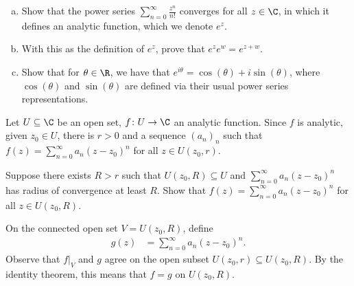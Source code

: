 \documentclass[10pt]{mypackage}
\begin{document}
\RaggedRight
\begin{problem}\hfill
  \begin{enumerate}[(a)]
    \item Show that the power series $\sum_{n=0}^{\infty}\frac{z^{n}}{n!}$ converges for all $z\in \C$, in which it defines an analytic function, which we denote $e^{z}$.
    \item With this as the definition of $e^{z}$, prove that $e^{z}e^{w} = e^{z+w}$.
    \item Show that for $\theta\in \R$, we have that $e^{i\theta} = \cos\left( \theta \right) + i\sin\left( \theta \right)$, where $\cos\left( \theta \right)$ and $\sin\left( \theta \right)$ are defined via their usual power series representations.
  \end{enumerate}
\end{problem}
\begin{problem}
  Let $U\subseteq \C$ be an open set, $f\colon U\rightarrow \C$ an analytic function. Since $f$ is analytic, given $z_0\in U$, there is $r > 0$ and a sequence $\left( a_n \right)_n$ such that $f(z) = \sum_{n=0}^{\infty}a_n\left( z-z_0 \right)^{n}$ for all $z\in U\left( z_0,r \right)$.\newline

  Suppose there exists $R > r$ such that $U\left( z_0,R \right) \subseteq U$ and $\sum_{n=0}^{\infty}a_n\left( z-z_0 \right)^{n}$ has radius of convergence at least $R$. Show that $f(z) = \sum_{n=0}^{\infty}a_n\left( z-z_0 \right)^{n}$ for all $z\in U\left( z_0,R \right)$.
\end{problem}
\begin{solution}
  On the connected open set $V = U\left( z_0,R \right)$, define
  \begin{align*}
    g(z) &= \sum_{n=0}^{\infty}a_n\left( z-z_0 \right)^{n}.
  \end{align*}
  Observe that $f|_{V}$ and $g$ agree on the open subset $U\left( z_0,r \right)\subseteq U\left( z_0,R \right)$. By the identity theorem, this means that $f = g$ on $U\left( z_0,R \right)$.
\end{solution}
\end{document}
